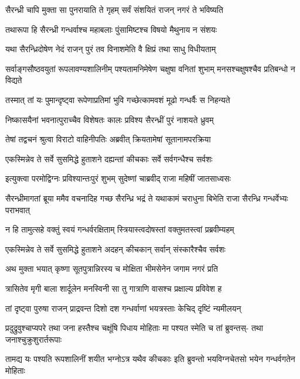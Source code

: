 \twolineshloka
{सैरन्ध्री चापि मुक्ता सा पुनरायाति ते गृहम्}
{सर्वं संशयितं राजन् नगरं ते भविष्यति}


\twolineshloka
{तथारूपा हि सैरन्ध्री गन्धर्वाश्च महाबलाः}
{पुंसामिष्टश्च विषयो मैथुनाय न संशयः}


\twolineshloka
{यथा सैरन्ध्रिदोषेण नेदं राजन् पुरं तव}
{विनाशमेति वै क्षिप्रं तथा साधु विधीयताम्}


\threelineshloka
{सर्वाङ्गसौष्ठवयुतां रूपलावण्यशालिनीम्}
{पश्यतामनिमेषेण चक्षुषा वनितां शुभाम्}
{मनसश्चक्षुषश्चैव प्रतिबन्धो न विद्यते}


\twolineshloka
{तस्मात् तां यः पुमान्दृष्ट्वा रूपेणाप्रतिमां भुवि}
{गच्छेत्कामवशं मूढो गन्धर्वैः स निहन्यते}


\twolineshloka
{निष्कासयैनां भवनात्पुराच्चैव विशेषतः}
{कालः प्रविश्य सैरन्ध्रीं पुरं नाशयते ध्रुवम्}



\twolineshloka
{तेषां तद्वचनं श्रुत्वा विराटो वाहिनीपतिः}
{अब्रवीत् क्रियतामेषां सूतानामपरक्रिया}


\twolineshloka
{एकस्मिन्नेव ते सर्वे सुसमिद्धे हुताशने}
{दह्यन्तां कीचकाः सर्वे सर्वगन्धैश्च सर्वशः}


\twolineshloka
{इत्युक्त्वा परमोद्विग्नः प्रविश्यान्तःपुरं शुभम्}
{सुदेष्णां चाब्रवीद् राजा महिषीं जातसाध्वसः}


\threelineshloka
{सैरन्ध्रीमागतां ब्रूया ममैव वचनादिह}
{गच्छ सैरन्ध्रि भद्रं ते यथाकामं चराधुना}
{बिभेति राजा सैरन्ध्रि गन्धर्वेभ्यः पराभवात्}


\twolineshloka
{न हि तामुत्सहे वक्तुं स्वयं गन्धर्वरक्षिताम्}
{स्त्रियास्त्वदोषस्तां वक्तुमतस्त्वां प्रब्रवीम्यहम्}



\twolineshloka
{एकस्मिन्नेव ते सर्वे सुसमिद्धे हुताशने}
{अदहन् कीचकान् सर्वान् संस्कारैश्चैव सर्वशः}


\twolineshloka
{अथ मुक्ता भयात् कृष्णा सूतपुत्रान्निरस्य च}
{मोक्षिता भीमसेनेन जगाम नगरं प्रति}


\twolineshloka
{त्रासितेव मृगी बाला शार्दूलेन मनस्विनी}
{सा तु गात्राणि वासश्च प्रक्षाल्य प्रविवेश ह}


\twolineshloka
{तां दृष्ट्वा पुरुषा राजन् प्राद्रवन्त दिशो दश}
{गन्धर्वाणां भयत्रस्ताः केचिद् दृष्टिं न्यमीलयन्}


\fourlineindentedshloka
{प्रदुद्रुवुश्चाप्यपरे तथा जना}
{हस्तैश्च चक्षूंषि पिधाय मोहिताः}
{मा पश्यत स्मेति च तां ब्रुवन्तस्-}
{तथा जनाश्चुक्रुशुरार्तरूपाः}


\fourlineindentedshloka
{तामद्य यः पश्यति रूपशालिनीं}
{शयीत भग्नोऽत्र यथैव कीचकाः}
{इति ब्रुवन्तो भयविग्नचेतसो}
{भयेन गन्धर्वगतेन मोहिताः}


